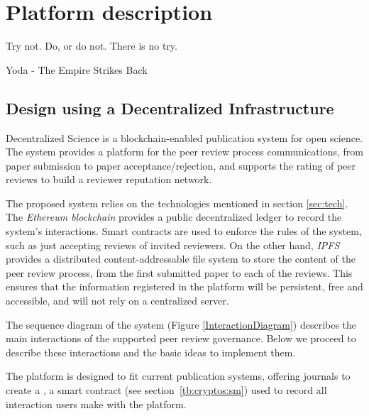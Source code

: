 \chapter{Platform description}
\label{cha:platform-description}
\begin{FraseCelebre}
  \begin{Frase}
    Try not. Do, or do not. There is no try.
  \end{Frase}
  \begin{Fuente}
    Yoda - The Empire Strikes Back
  \end{Fuente}
\end{FraseCelebre}
\section{Design using a Decentralized Infrastructure}
\label{archAndDes}
Decentralized Science is a blockchain-enabled publication system for open
science. The system provides a platform for the peer review process
communications, from paper submission to paper acceptance/rejection, and
supports the rating of peer reviews to build a reviewer reputation network.

The proposed system relies on the technologies mentioned in section
\ref{sec:tech}. The \emph{Ethereum blockchain} provides a public decentralized
ledger to record the system's interactions. Smart contracts are used to enforce
the rules of the system, such as just accepting reviews of invited reviewers. On
the other hand, \emph{IPFS} provides a distributed content-addressable file
system to store the content of the peer review process, from the first submitted
paper to each of the reviews. This ensures that the information registered in
the platform will be persistent, free and accessible, and will not rely on a
centralized server.


The sequence diagram of the system (Figure \ref{InteractionDiagram}) describes
the main interactions of the supported peer review governance. Below we proceed
to describe these interactions and the basic ideas to implement them.


\label{cha:platform-description-6}

The platform is designed to fit current publication systems, offering journals
to create a , a smart contract (see
section~\ref{tb:cryptos:sm}) used to record all interaction users make with the
platform.

